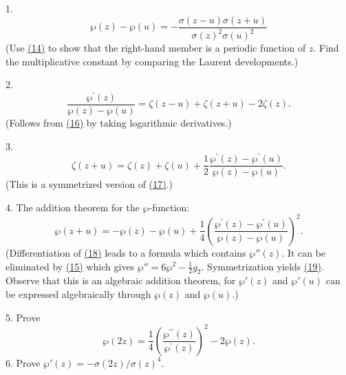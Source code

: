 1.
\begin{equation*}
\wp (z) - \wp (u) = - \frac {\sigma (z - u) \sigma (z + u)}{\sigma (z) ^ {2} \sigma (u) ^ {2}}\tag{16}\label{eq:7.16}
\end{equation*}
(Use \hyperref[eq:7.14]{(14)} to show that the right-hand member is a periodic function of $z$. Find the multiplicative constant by comparing the Laurent developments.)


2.
\begin{equation*}
\frac {\wp^ {\prime} (z)}{\wp (z) - \wp (u)} = \zeta (z - u) + \zeta (z + u) - 2 \zeta (z).\tag{17}\label{eq:7.17}
\end{equation*}
(Follows from \hyperref[eq:7.16]{(16)} by taking logarithmic derivatives.)

3.
\begin{equation*}
\zeta (z + u) = \zeta (z) + \zeta (u) + \frac {1}{2} \frac {\wp^ {\prime} (z) - \wp^ {\prime} (u)}{\wp (z) - \wp (u)}.\tag{18}\label{eq:7.18}
\end{equation*}
(This is a symmetrized version of \hyperref[eq:7.17]{(17)}.)

4. The addition theorem for the $\wp$-function:
\begin{equation*}
\wp (z + u) = - \wp (z) - \wp (u) + \frac {1}{4} \left(\frac {\wp^ {\prime} (z) - \wp^ {\prime} (u)}{\wp (z) - \wp (u)}\right) ^ {2}.\tag{19}\label{eq:7.19}
\end{equation*}
(Differentiation of \hyperref[eq:7.18]{(18)} leads to a formula which contains $\wp''(z)$. It can be eliminated by \hyperref[eq:7.15]{(15)} which gives $\wp'' = 6\wp^2 - \frac{1}{2} g_2$. Symmetrization yields \hyperref[eq:7.19]{(19)}. Observe that this is an algebraic addition theorem, for $\wp'(z)$ and $\wp'(u)$ can be expressed algebraically through $\wp(z)$ and $\wp(u)$.)

5. Prove
\begin{equation*}
\wp (2 z) = \frac {1}{4} \left(\frac {\wp^ {\prime \prime} (z)}{\wp^ {\prime} (z)}\right) ^ {2} - 2 \wp (z).
\end{equation*}
6. Prove $\wp'(z) = -\sigma(2z)/\sigma(z)^4$.

